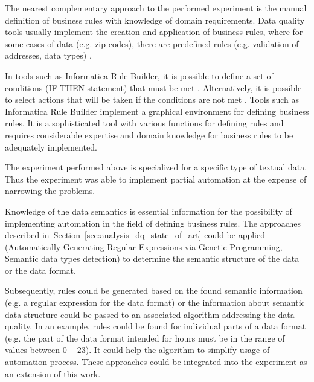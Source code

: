 				The nearest complementary approach to the performed experiment is the manual definition of business rules with knowledge of domain requirements. Data quality tools usually implement the creation and application of business rules, where for some cases of data (e.g. zip codes), there are predefined rules (e.g. validation of addresses, data types) \cite{Ehrlinger2019}.

				In tools such as Informatica Rule Builder, it is possible to define a set of conditions (IF-THEN statement) that must be met \cite{Informatica2014}. Alternatively, it is possible to select actions that will be taken if the conditions are not met \cite{Informatica2014}. Tools such as Informatica Rule Builder implement a graphical environment for defining business rules. It is a sophisticated tool with various functions for defining rules and requires considerable expertise and domain knowledge for business rules to be adequately implemented.
				
				The experiment performed above is specialized for a specific type of textual data. Thus the experiment was able to implement partial automation at the expense of narrowing the problems. 
				
				Knowledge of the data semantics is essential information for the possibility of implementing automation in the field of defining business rules. The approaches described in~Section~\ref{sec:analysis_dq_state_of_art} could be applied (Automatically Generating Regular Expressions via Genetic Programming, Semantic data types detection) to determine the semantic structure of the data or the data format. 
				
				Subsequently, rules could be generated based on the found semantic information (e.g. a regular expression for the data format) or the information about semantic data structure could be passed to an associated algorithm addressing the data quality. In an example, rules could be found for individual parts of a data format (e.g. the part of the data format intended for hours must be in the range of values between $0-23$). It could help the algorithm to simplify usage of automation process. These approaches could be integrated into the experiment as an extension of this work.
